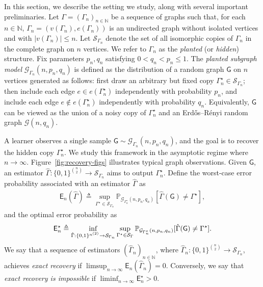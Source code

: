 \documentclass[12pt]{article}
\newcommand {\pr} {\mathbb{P}}
\newcommand{\calS}{{\cal S}}
\newcommand{\s}[1]{\mathsf{#1}}
\begin{document}
In this section, we describe the setting we study, along with several important preliminaries. Let $\Gamma = (\Gamma_n)_{n \in \mathbb{N}}$ be a sequence of graphs such that, for each $n \in \mathbb{N}$, $\Gamma_n = (v(\Gamma_n), e(\Gamma_n))$ is an undirected graph without isolated vertices and with $|v(\Gamma_n)| \leq n$. Let $\mathcal{S}_{\Gamma_n}$ denote the set of all isomorphic copies of $\Gamma_n$ in the complete graph on $n$ vertices. We refer to $\Gamma_n$ as the \emph{planted} (or \emph{hidden}) structure. Fix parameters $p_n,q_n$ satisfying $0 < q_n < p_n \leq 1$. The \emph{planted subgraph model} $\mathcal{G}_{\Gamma_n}(n,p_n,q_n)$ is defined as the distribution of a random graph $\mathsf{G}$ on $n$ vertices generated as follows: first draw an arbitrary but fixed copy $\Gamma_n^\star \in \mathcal{S}_{\Gamma_n}$; then include each edge $e \in e(\Gamma_n^\star)$ independently with probability $p_n$, and include each edge $e \notin e(\Gamma_n^\star)$ independently with probability $q_n$. Equivalently, $\mathsf{G}$ can be viewed as the union of a noisy copy of $\Gamma_n^\star$ and an Erd\H{o}s--R\'enyi random graph $\mathcal{G}(n,q_n)$.

A learner observes a single sample $\mathsf{G} \sim \mathcal{G}_{\Gamma_n}(n,p_n,q_n)$, and the goal is to recover the hidden copy $\Gamma_n^\star$. We study this framework in the asymptotic regime where $n \to \infty$. Figure~\ref{fig:recovery-figs} illustrates typical graph observations. Given $\mathsf{G}$, an estimator $\widehat\Gamma:\{0,1\}^{\binom{n}{2}}\to\mathcal S_{\Gamma_n}$ aims to output $\Gamma_n^\star$.
Define the worst-case error probability associated with an estimator $\widehat{\Gamma}$ as
\begin{align}
    \s{E}_n(\hat{\Gamma})\triangleq\sup_{\Gamma^\star\in\mathcal{S}_{\Gamma_n}}\pr_{\mathcal{G}_{\Gamma_n^\star}(n, p_n, q_n)}[\hat{\Gamma}(\s{G})\neq\Gamma^\star],
\end{align}
and the optimal error probability as
\begin{align}
    \s{E}_n^\star \triangleq \inf_{\hat{\Gamma}:\{0,1\}^{n^{(2)}} \to \calS_{\Gamma_n}} \sup_{\Gamma^\star \in \calS_\Gamma} \pr_{\mathcal{G}_{\Gamma_n^\star}(n, p_n, q_n)}[\hat{\Gamma}(\s{G})\neq\Gamma^\star].
\end{align}
We say that a sequence of estimators $(\widehat{\Gamma}_n)_{n \in \mathbb{N}}$, where $\widehat{\Gamma}_n : \{0,1\}^{\binom{n}{2}} \to \mathcal{S}_{\Gamma_n}$, achieves \emph{exact recovery} if $\limsup_{n\to\infty}\s{E}_n(\widehat{\Gamma}_n)= 0$. Conversely, we say that \emph{exact recovery is impossible} if $\liminf_{n \to \infty} \s{E}_n^\star>0$.
\end{document}
